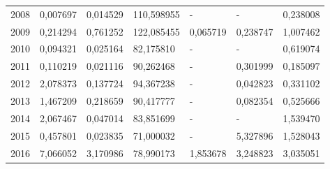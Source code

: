 \begin{table}
\begin{tabular}{p{1cm}p{2cm}p{2cm}p{2cm}p{2cm}p{2cm}p{2cm}}
 2008 &                               0,007697 &                                      0,014529 &                 110,598955 &                                            - &                                - &                            0,238008 \\
 2009 &                               0,214294 &                                      0,761252 &                 122,085455 &                                     0,065719 &                         0,238747 &                            1,007462 \\
 2010 &                               0,094321 &                                      0,025164 &                  82,175810 &                                            - &                                - &                            0,619074 \\
 2011 &                               0,110219 &                                      0,021116 &                  90,262468 &                                            - &                         0,301999 &                            0,185097 \\
 2012 &                               2,078373 &                                      0,137724 &                  94,367238 &                                            - &                         0,042823 &                            0,331102 \\
 2013 &                               1,467209 &                                      0,218659 &                  90,417777 &                                            - &                         0,082354 &                            0,525666 \\
 2014 &                               2,067467 &                                      0,047014 &                  83,851699 &                                            - &                                - &                            1,539470 \\
 2015 &                               0,457801 &                                      0,023835 &                  71,000032 &                                            - &                         5,327896 &                            1,528043 \\
 2016 &                               7,066052 &                                      3,170986 &                  78,990173 &                                     1,853678 &                         3,248823 &                            3,035051 \\
\bottomrule
\end{tabular}
\end{table}
